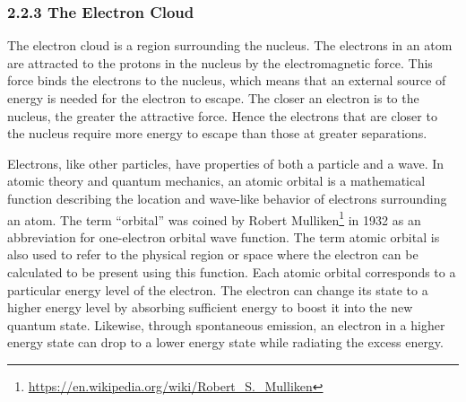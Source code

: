 \documentclass[
]{article}
\let\rmarkdownfootnote\footnote%
\def\footnote{\protect\rmarkdownfootnote}
\renewcommand{\href}[2]{#2\footnote{\url{#1}}}
\theoremstyle{definition}
\theoremstyle{definition}
\theoremstyle{definition}
\theoremstyle{remark}
\begin{document}
\hypertarget{the-electron-cloud}{%
\subsubsection{\texorpdfstring{{2.2.3} The Electron
Cloud}{2.2.3 The Electron Cloud}}\label{the-electron-cloud}}

The electron cloud is a region surrounding the nucleus. The electrons in
an atom are attracted to the protons in the nucleus by the
electromagnetic force. This force binds the electrons to the nucleus,
which means that an external source of energy is needed for the electron
to escape. The closer an electron is to the nucleus, the greater the
attractive force. Hence the electrons that are closer to the nucleus
require more energy to escape than those at greater separations.

Electrons, like other particles, have properties of both a particle and
a wave. In atomic theory and quantum mechanics, an atomic orbital is a
mathematical function describing the location and wave-like behavior of
electrons surrounding an atom. The term ``orbital'' was coined by
\href{https://en.wikipedia.org/wiki/Robert_S._Mulliken}{Robert Mulliken}
in 1932 as an abbreviation for one-electron orbital wave function. The
term atomic orbital is also used to refer to the physical region or
space where the electron can be calculated to be present using this
function. Each atomic orbital corresponds to a particular energy level
of the electron. The electron can change its state to a higher energy
level by absorbing sufficient energy to boost it into the new quantum
state. Likewise, through spontaneous emission, an electron in a higher
energy state can drop to a lower energy state while radiating the excess
energy.
\end{document}
